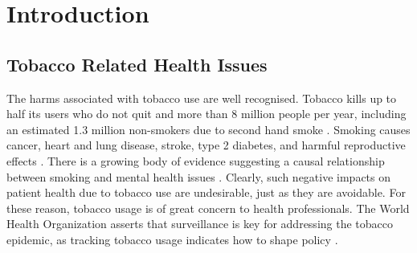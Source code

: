 \documentclass{article}
\begin{document}
\doublespacing















\section{Introduction}
\subsection{Tobacco Related Health Issues}
The harms associated with tobacco use are well recognised. Tobacco kills up to half its users who do not quit and more than 8 million people per year, including an estimated 1.3 million non-smokers due to second hand smoke \cite{who_tobacco}. Smoking causes cancer, heart and lung disease, stroke, type 2 diabetes, and harmful reproductive effects \cite{hhs_smoking_2014}. There is a growing body of evidence suggesting a causal relationship between smoking and mental health issues \cite{taylor2019smoking}. Clearly, such negative impacts on patient health due to tobacco use are undesirable, just as they are avoidable. For these reason, tobacco usage is of great concern to health professionals. The World Health Organization asserts that surveillance is key for addressing the tobacco epidemic, as tracking tobacco usage indicates how to shape policy \cite{who_tobacco}.
\end{document}
